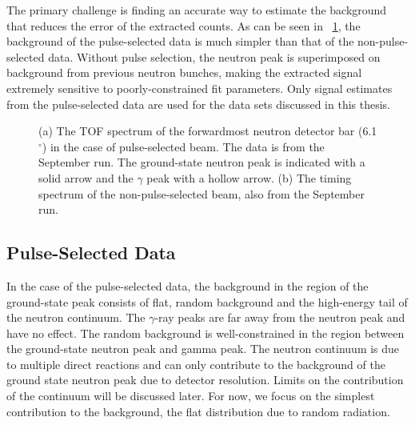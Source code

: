 The primary challenge is finding an accurate way to estimate the background that reduces the error of the extracted counts.  As can be seen in {\fig}~\ref{fig:PSvsNPS}, the background of the pulse-selected data is much simpler than that of the non-pulse-selected data.  Without pulse selection, the neutron peak is superimposed on background from previous neutron bunches, making the extracted signal extremely sensitive to poorly-constrained fit parameters.  Only signal estimates from the pulse-selected data are used for the data sets discussed in this thesis.
\begin{figure}[!htbp]
\centering
{}
\caption[Comparison of pulse-selected and non-pulse-selected timing spectra from $^{74}$Mg(,n).]{(a) The TOF spectrum of the forwardmost neutron detector bar (6.1$^{\circ}$) in the case of pulse-selected beam.  The data is from the September run.  The ground-state neutron peak is indicated with a solid arrow and the $\gamma$ peak with a hollow arrow. (b) The timing spectrum of the  non-pulse-selected beam, also from the September run.}
\label{fig:PSvsNPS}
\end{figure}

\subsection{Pulse-Selected Data}
\label{sec:PS_data}
In the case of the pulse-selected data, the background in the region of the ground-state peak consists of flat, random background and the high-energy tail of the neutron continuum.  The $\gamma$-ray peaks are far away from the neutron peak and have no effect.  The random background is well-constrained in the region between the ground-state neutron peak and gamma peak.  The neutron continuum is due to multiple direct reactions and can only contribute to the background of the ground state neutron peak due to detector resolution.  Limits on the contribution of the continuum will be discussed later.  For now, we focus on the simplest contribution to the background, the flat distribution due to random radiation.

